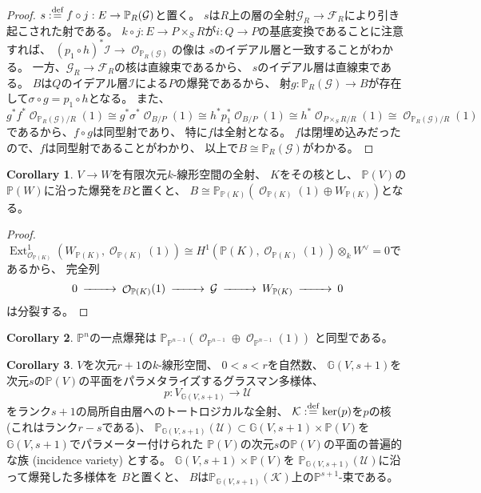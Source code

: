 \documentclass[uplatex]{jsarticle}
\theoremstyle{definition}
\newtheorem{cor}[cor]{Corollary}
\DeclareMathOperator{\Ext}{\mathrm{Ext}}
\renewcommand{\P}{\mathbb{P}}
\newcommand{\mcF}{\mathcal{F}}
\newcommand{\mcG}{\mathcal{G}}
\newcommand{\mcI}{\mathcal{I}}
\newcommand{\mcK}{\mathcal{K}}
\newcommand{\mcO}{\mathcal{O}}
\newcommand{\mcU}{\mathcal{U}}
\DeclareMathOperator{\OOO}{\mcO}
\newcommand{\OO}[1]{\OOO_{#1}}
\def\dfn{:\overset{\mbox{{\scriptsize def}}}{=}}
\begin{document}
\begin{proof}
  \(s\dfn f\circ j:E \to \P_R(\mcG)\)と置く。
  \(s\)は\(R\)上の層の全射\(\mcG_R\to \mcF_R\)により引き起こされた射である。
  \(k\circ j:E\to P\times_SR\)が\(i:Q\to P\)の基底変換であることに注意すれば、
  \((p_1\circ h)^*\mcI\to \OO{\P_R(\mcG)}\)の像は
  \(s\)のイデアル層と一致することがわかる。
  一方、\(\mcG_R\to \mcF_R\)の核は直線束であるから、
  \(s\)のイデアル層は直線束である。
  \(B\)は\(Q\)のイデアル層\(\mcI\)による\(P\)の爆発であるから、
  射\(g:\P_R(\mcG)\to B\)が存在して\(\sigma\circ g = p_1\circ h\)となる。
  また、
  \[
  g^*f^*\OO{\P_R(\mcG)/R}(1)\cong g^*\sigma^*\OO{B/P}(1)\cong
  h^*p_1^*\OO{B/P}(1)\cong h^*\OO{P\times_SR/R}(1)\cong \OO{\P_R(\mcG)/R}(1)
  \]
  であるから、\(f\circ g\)は同型射であり、
  特に\(f\)は全射となる。
  \(f\)は閉埋め込みだったので、\(f\)は同型射であることがわかり、
  以上で\(B\cong \P_R(\mcG)\)がわかる。
\end{proof}




\begin{cor}\label{cor: main}
  \(V\to W\)を有限次元\(k\)-線形空間の全射、
  \(K\)をその核とし、
  \(\P(V)\)の\(\P(W)\)に沿った爆発を\(B\)と置くと、
  \(B\cong \P_{\P(K)}(\OO{\P(K)}(1)\oplus W_{\P(K)})\)となる。
\end{cor}

\begin{proof}
  \(\Ext^1_{\OO{\P(K)}}(W_{\P(K)}, \OO{\P(K)}(1))
  \cong H^1(\P(K), \OO{\P(K)}(1))\otimes_kW^{\vee} = 0\)であるから、
  完全列
  \[
  \begin{CD}
    0 @>>> \OO{\P(K)}(1) @>>> \mcG @>>> W_{\P(K)} @>>> 0
  \end{CD}
  \]
  は分裂する。
\end{proof}


\begin{cor}
  \(\P^n\)の一点爆発は
  \(\P_{\P^{n-1}}(\OO{\P^{n-1}}\oplus \OO{\P^{n-1}}(1))\)
  と同型である。
\end{cor}


\begin{cor}
  \(V\)を次元\(r+1\)の\(k\)-線形空間、
  \(0<s<r\)を自然数、
  \(\mathbb{G}(V,s+1)\)を次元\(s\)の\(\P(V)\)の平面をパラメタライズするグラスマン多様体、
  \[
  p:V_{\mathbb{G}(V,s+1)}\to \mcU
  \]
  をランク\(s+1\)の局所自由層へのトートロジカルな全射、
  \(\mcK \dfn \ker(p)\)を\(p\)の核 (これはランク\(r-s\)である)、
  \(\P_{\mathbb{G}(V,s+1)}(\mcU)\subset \mathbb{G}(V,s+1)\times \P(V)\)を
  \(\mathbb{G}(V,s+1)\)でパラメーター付けられた
  \(\P(V)\)の次元\(s\)の\(\P(V)\)の平面の普遍的な族
  (incidence variety) とする。
  \(\mathbb{G}(V,s+1)\times \P(V)\)を
  \(\P_{\mathbb{G}(V,s+1)}(\mcU)\)に沿って爆発した多様体を
  \(B\)と置くと、
  \(B\)は\(\P_{\mathbb{G}(V,s+1)}(\mcK)\)上の\(\P^{s+1}\)-束である。
\end{cor}
\end{document}
